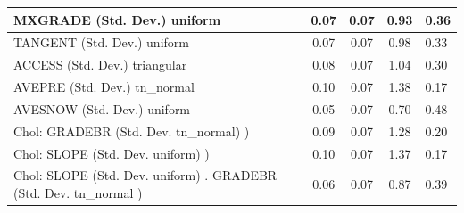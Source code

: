 \begin{table}
\begin{center}
\begin{tabular}{|l|l|c|c|c|l|}
			\hline
			MXGRADE (Std. Dev.) uniform &  & 0.07 & 0.07 & 0.93 & 0.36 \\
			\hline
			TANGENT (Std. Dev.) uniform &  & 0.07 & 0.07 & 0.98 & 0.33 \\
			\hline
			ACCESS (Std. Dev.) triangular &  & 0.08 & 0.07 & 1.04 & 0.30 \\
			\hline
			AVEPRE (Std. Dev.) tn_normal &  & 0.10 & 0.07 & 1.38 & 0.17 \\
			\hline
			AVESNOW (Std. Dev.) uniform &  & 0.05 & 0.07 & 0.70 & 0.48 \\
			\hline
			 Chol: GRADEBR (Std. Dev. tn_normal) ) &  & 0.09 & 0.07 & 1.28 & 0.20 \\
			\hline
			 Chol: SLOPE (Std. Dev. uniform) ) &  & 0.10 & 0.07 & 1.37 & 0.17 \\
			\hline
			 Chol: SLOPE (Std. Dev. uniform) . GRADEBR (Std. Dev.   tn_normal ) &  & 0.06 & 0.07 & 0.87 & 0.39 \\
			\hline
		\end{tabular}
	\end{center}
\end{table}